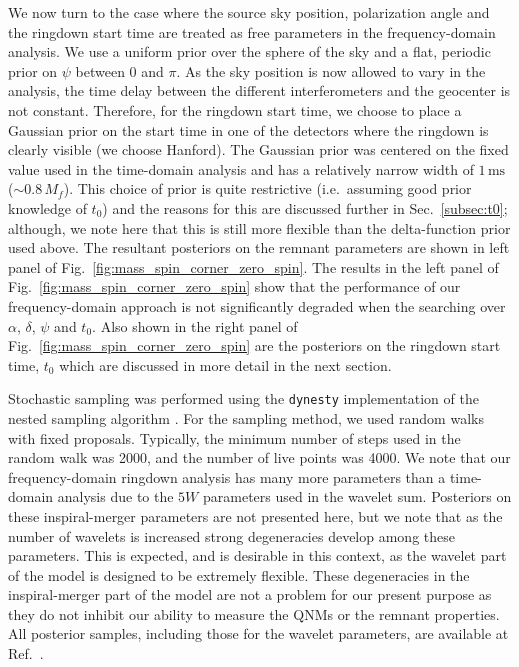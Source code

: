 We now turn to the case where the source sky position, polarization angle and the ringdown start time are treated as free parameters in the frequency-domain analysis.
We use a uniform prior over the sphere of the sky and a flat, periodic prior on $\psi$ between $0$ and $\pi$.
As the sky position is now allowed to vary in the analysis, the time delay between the different interferometers and the geocenter is not constant. 
Therefore, for the ringdown start time, we choose to place a Gaussian prior on the start time in one of the detectors where the ringdown is clearly visible (we choose Hanford). 
The Gaussian prior was centered on the fixed value used in the time-domain analysis and has a relatively narrow width of $1\,\mathrm{ms}$ ($\sim 0.8\,M_f$).
This choice of prior is quite restrictive (i.e.\ assuming good prior knowledge of $t_0$) and the reasons for this are discussed further in Sec.~\ref{subsec:t0}; although, we note here that this is still more flexible than the delta-function prior used above.
The resultant posteriors on the remnant parameters are shown in left panel of Fig.~\ref{fig:mass_spin_corner_zero_spin}.
The results in the left panel of Fig.~\ref{fig:mass_spin_corner_zero_spin} show that the performance of our frequency-domain approach is not significantly degraded when the searching over $\alpha$, $\delta$, $\psi$ and $t_0$.
Also shown in the right panel of Fig.~\ref{fig:mass_spin_corner_zero_spin} are the posteriors on the ringdown start time, $t_0$ which are discussed in more detail in the next section.

Stochastic sampling was performed using the \texttt{dynesty} \cite{Speagle:2019ivv} implementation of the nested sampling algorithm \cite{doi:10.1063/1.1835238, Skilling:2006gxv}.
For the sampling method, we used random walks with fixed proposals.
Typically, the minimum number of steps used in the random walk was 2000, and the number of live points was 4000.
We note that our frequency-domain ringdown analysis has many more parameters than a time-domain analysis due to the $5W$ parameters used in the wavelet sum.
Posteriors on these inspiral-merger parameters are not presented here, but we note that as the number of wavelets is increased strong degeneracies develop among these parameters.
This is expected, and is desirable in this context, as the wavelet part of the model is designed to be extremely flexible. 
These degeneracies in the inspiral-merger part of the model are not a problem for our present purpose as they do not inhibit our ability to measure the QNMs or the remnant properties. 
All posterior samples, including those for the wavelet parameters, are available at Ref.~\cite{finch_eliot_2021_5569759}.


